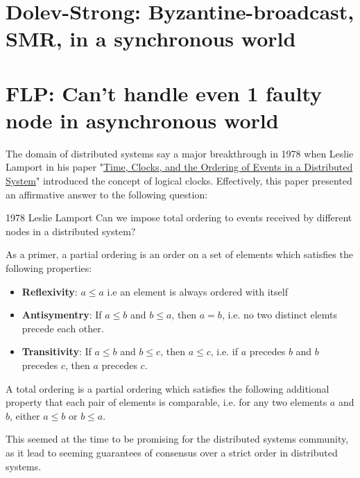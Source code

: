 \section{Dolev-Strong: Byzantine-broadcast, SMR, in a synchronous world}
\section{FLP: Can't handle even 1 faulty node in asynchronous world}

The domain of distributed systems say a major breakthrough in 1978 when Leslie Lamport in his paper "\href{https://amturing.acm.org/p558-lamport.pdf}{Time, Clocks, and the Ordering of Events in a Distributed System}" introduced the concept of logical clocks. Effectively, this paper presented an affirmative answer to the following question:

\begin{quotebox}{1978 Leslie Lamport}
    Can we impose total ordering to events received by different nodes in a distributed system?
\end{quotebox}

As a primer, a partial ordering is an order on a set of elements which satisfies the following properties:
\begin{itemize}
    \item \textbf{Reflexivity}: $a \leq a$ i.e an element is always ordered with itself
    \item \textbf{Antisymentry}: If $a \leq b$ and $b \leq a$, then $a = b$, i.e. no two distinct elemts precede each other.
    \item \textbf{Transitivity}: If $a \leq b$ and $b \leq c$, then $a \leq c$, i.e. if $a$ precedes $b$ and $b$ precedes $c$, then $a$ precedes $c$.
\end{itemize}

A total ordering is a partial ordering which satisfies the following additional property that each pair of elements is comparable, i.e. for any two elements $a$ and $b$, either $a \leq b$ or $b \leq a$.

This seemed at the time to be promising for the distributed systems community, as it lead to seeming guarantees of consensus over a strict order in distributed systems. 

